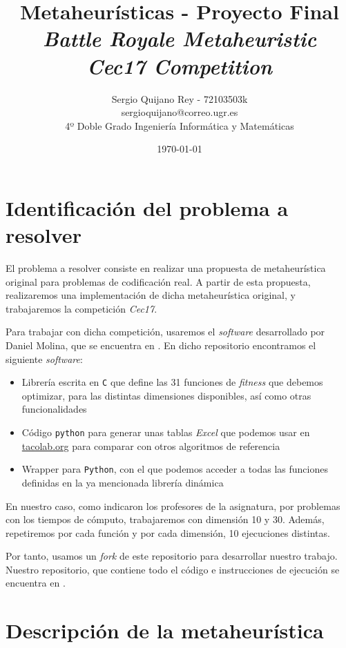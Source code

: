 \documentclass[11pt]{article}
\title{
    {Metaheurísticas - Proyecto Final}\\
    {\emph{Battle Royale Metaheuristic}}\\
    {\emph{Cec17 Competition}}
}
\author{
    {Sergio Quijano Rey - 72103503k}\\
    {sergioquijano@correo.ugr.es} \\
    {4º Doble Grado Ingeniería Informática y Matemáticas}
}
\date{\today}
\begin{document}
\maketitle
\pagebreak

\tableofcontents

\listoffigures

\listoftables

\pagebreak
\section{Identificación del problema a resolver}

El problema a resolver consiste en realizar una propuesta de metaheurística original para problemas de codificación real. A partir de esta propuesta, realizaremos una implementación de dicha metaheurística original, y trabajaremos la competición \emph{Cec17}.

Para trabajar con dicha competición, usaremos el \emph{software} desarrollado por Daniel Molina, que se encuentra en \cite{daniel_repo:online}. En dicho repositorio encontramos el siguiente \emph{software}:

\begin{itemize}
    \item Librería escrita en \lstinline{C} que define las 31 funciones de \emph{fitness} que debemos optimizar, para las distintas dimensiones disponibles, así como otras funcionalidades
    \item Código \lstinline{python} para generar unas tablas \emph{Excel} que podemos usar en \href{tacolab.org}{tacolab.org} para comparar con otros algoritmos de referencia
    \item Wrapper para \lstinline{Python}, con el que podemos acceder a todas las funciones definidas en la ya mencionada librería dinámica
\end{itemize}

En nuestro caso, como indicaron los profesores de la asignatura, por problemas con los tiempos de cómputo, trabajaremos con dimensión 10 y 30. Además, repetiremos por cada función y por cada dimensión, 10 ejecuciones distintas.

Por tanto, usamos un \emph{fork} de este repositorio para desarrollar nuestro trabajo. Nuestro repositorio, que contiene todo el código e instrucciones de ejecución se encuentra en \cite{repositorio:online}.

\pagebreak
\section{Descripción de la metaheurística} \label{descripcion}
\end{document}
